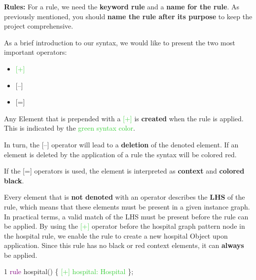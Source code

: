 \textbf{Rules:}\newline
For a rule, we need the \textbf{keyword rule} and a \textbf{name for the rule}. As previously mentioned, you should \textbf{name the rule after its purpose} to keep the project comprehensive.\newline

As a brief introduction to our syntax, we would like to present the two most important operators:

\begin{itemize}
    \item \textcolor{LimeGreen}{[+]} 
    \item {\color{red} [--] }
    \item {[=]}
\end{itemize}
Any Element that is prepended with a \textcolor{LimeGreen}{ [+]} is \textbf{created} when the rule is applied. This is indicated by the \textcolor{LimeGreen}{ green syntax color}.\newline

In turn, the {\color{red} [--] } operator will lead to a \textbf{deletion} of the denoted element. If an element is deleted by the application of a rule the {\color{red}syntax will be colored red}. \newline

If the {[=]} operators is used, the element is interpreted as \textbf{context} and \textbf{colored black}.\newline

Every element that is \textbf{not denoted} with an operator describes the \textbf{LHS} of the rule, which means that these elements must be present in a given instance graph.\newline
In practical terms, a valid match of the LHS must be present before the rule can be applied.\newline
By using the \textcolor{LimeGreen}{[+]} operator before the hospital graph pattern node in the hospital rule, we enable the rule to create a new hospital Object upon application. Since this rule has no black or red context elements, it can \textbf{always} be applied. \newline

{

1  \hspace{0.5cm}  \textcolor{Purple}{rule} hospital() \{  \hspace{1cm}  \textcolor{LimeGreen}{[+] hospital: Hospital}  \hspace{0.5cm}  \};\newline

}

